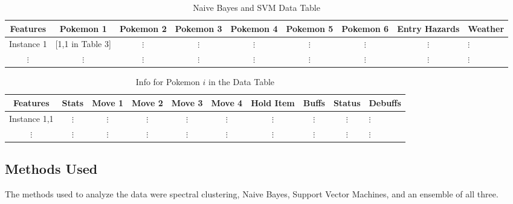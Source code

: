 \documentclass{acm_proc_article-sp}
\begin{document}
\begin{table*}

\centering

\caption{Naive Bayes and SVM Data Table}

\begin{tabular}{|c|c|c|c|c|c|c|c|l|} \hline

Features & Pokemon 1 & Pokemon 2 & Pokemon 3 & Pokemon 4 & Pokemon 5 & Pokemon 6 & Entry Hazards & Weather \\ \hline

Instance 1 & [1,1 in Table 3] & $\vdots$ & $\vdots$ & $\vdots$ & $\vdots$ & $\vdots$ & $\vdots$ & $\vdots$ \\ \hline

$\vdots$ & $\vdots$ & $\vdots$ & $\vdots$ & $\vdots$ & $\vdots$ & $\vdots$ & $\vdots$ & $\vdots$ \\ \hline

\end{tabular}

\end{table*}

\begin{table*}

\centering

\caption{Info for Pokemon $i$ in the Data Table}

\begin{tabular}{|c|c|c|c|c|c|c|c|c|l|} \hline

Features & Stats & Move 1 & Move 2 & Move 3 & Move 4 & Hold Item & Buffs & Status & Debuffs \\ \hline

Instance 1,1 & $\vdots$ & $\vdots$ & $\vdots$ & $\vdots$ & $\vdots$ & $\vdots$ & $\vdots$ & $\vdots$ & $\vdots$ \\ \hline

$\vdots$ & $\vdots$ & $\vdots$ & $\vdots$ & $\vdots$ & $\vdots$ & $\vdots$ & $\vdots$ & $\vdots$ & $\vdots$ \\ \hline

\end{tabular}

\end{table*}

\subsection{Methods Used}
The methods used to analyze the data were spectral clustering, Naive Bayes, Support Vector Machines, and an ensemble of all three.
\end{document}
